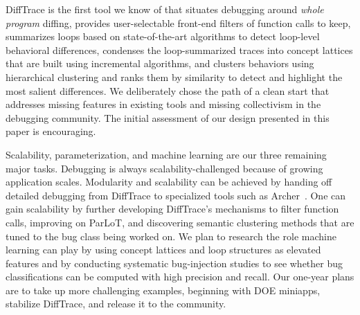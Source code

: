 DiffTrace is the first tool we know of that situates debugging around {\em whole program}
diffing, provides user-selectable front-end filters of function calls to keep,
summarizes loops based on state-of-the-art algorithms to detect loop-level
behavioral differences,
condenses the loop-summarized
traces into concept lattices that are built using incremental
algorithms, and clusters behaviors using hierarchical clustering and ranks them by similarity to detect and highlight the most salient differences.
%
We deliberately chose the path of a clean start that addresses missing features
in existing tools and missing collectivism in the debugging community.
%
The initial assessment of our design presented in this paper is encouraging.


Scalability, parameterization, and machine learning are our three remaining major tasks.
%
Debugging is always scalability-challenged because of growing application scales.
%
Modularity and scalability can be achieved by handing off detailed debugging from
DiffTrace to specialized tools such as Archer~\cite{archer}.
%
One can gain scalability by further developing DiffTrace's mechanisms to filter function
calls, improving on ParLoT, and discovering semantic clustering
methods that are tuned to the bug class being worked on.
%
We plan to research the role machine learning can play by using concept lattices
and loop structures as elevated features and by conducting systematic bug-injection
studies to see whether bug classifications can be computed with high precision
and recall.
%
Our one-year plans are to take up more challenging examples, beginning with DOE miniapps, stabilize DiffTrace, and release it to the community.
 

